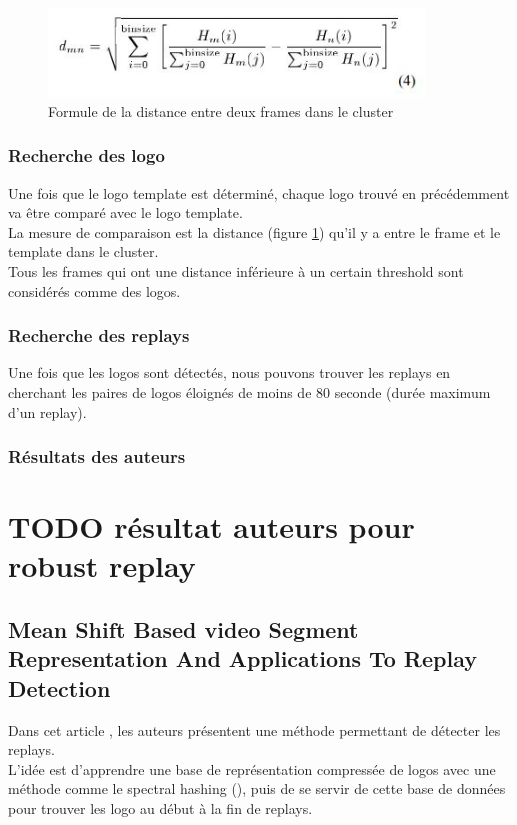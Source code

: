 \documentclass[11pt]{article}
\begin{document}
\begin{figure}[htbp]
\centering
\includegraphics[width=10cm]{robust_calc_dist.JPG}
\caption{Formule de la distance entre deux frames dans le cluster \label{calc-dist}}
\end{figure}


\subsubsection{Recherche des logo}
\label{sec:orga140315}
Une fois que le logo template est déterminé, chaque logo trouvé en précédemment va être comparé avec le logo template.\\
La mesure de comparaison est la distance (figure \ref{calc-dist}) qu'il y a entre le frame et le template dans le cluster.\\
Tous les frames qui ont une distance inférieure à un certain threshold sont considérés comme des logos.\\

\subsubsection{Recherche des replays}
\label{sec:orgfc4aaca}
Une fois que les logos sont détectés, nous pouvons trouver les replays en cherchant les paires de logos éloignés de moins de 80 seconde (durée maximum d'un replay).\\

\subsubsection{Résultats des auteurs}
\label{sec:org7c52c2e}
\section{{\bfseries\sffamily TODO} résultat auteurs pour robust replay}
\label{sec:orga1a0e99}




\subsection{Mean Shift Based video Segment Representation And Applications To Replay Detection}
\label{sec:orga271db2}
Dans cet article \cite{Ling_Yu_Duan}, les auteurs présentent une méthode permettant de détecter les replays.\\
L'idée est d'apprendre une base de représentation compressée de logos avec une méthode comme le spectral hashing (\cite{NIPS2008_3383}), puis de se servir de cette base de données pour trouver les logo au début à la fin de replays.\\
\end{document}
